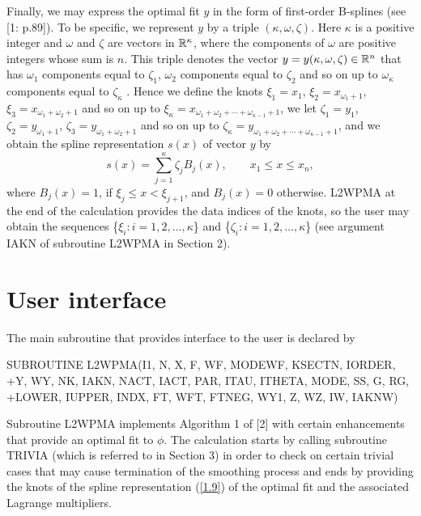 \documentclass[acmtoms]{acmtrans2m}
\begin{document}
Finally, we may express the optimal fit $y$ in the form of first-order
B-splines (see [1: p.89]). To be specific, we represent $y$ by a triple $%
(\kappa ,\omega ,\zeta )$. Here $\kappa $ is a positive integer and $\omega $
and $\zeta $ are vectors in $\Bbb{R}^{\kappa }$, where the components of $%
\omega $ are positive integers whose sum is $n$. This triple denotes the
vector $y=y(\kappa ,\omega ,\zeta )\in \Bbb{R}^{n}$ that has $\omega _{1}$
components equal to $\zeta _{1}$, $\omega _{2}$ components equal to $\zeta
_{2}$ and so on up to $\omega _{\kappa }$ components equal to $\zeta
_{\kappa }$ . Hence we define the knots $\xi _{1}=x_{1}$, $\xi
_{2}=x_{\omega _{1}+1}$, $\xi _{3}=x_{\omega _{1}+\omega _{2}+1}$ and so on
up to $\xi _{\kappa }=x_{\omega _{1}+\omega _{2}+\cdots +\omega _{\kappa
-1}+1}$, we let $\zeta _{1}=y_{1}$, $\zeta _{2}=y_{\omega _{1}+1}$, $\zeta
_{3}=y_{\omega _{1}+\omega _{2}+1}$ and so on up to $\zeta _{\kappa
}=y_{\omega _{1}+\omega _{2}+\cdots +\omega _{\kappa -1}+1}$, and we obtain
the spline representation $s(x)$ of vector $y$ by 
\begin{equation}
s(x)=\sum\limits_{j=1}^{\kappa }\zeta _{j}B_{j}(x),\qquad x_{1}\leq x\leq
x_{n},  \label{1.9}
\end{equation}
where $B_{j}(x)=1$, if $\xi _{j}\leq x<\xi _{j+1}$, and $B_{j}(x)=0$
otherwise. L2WPMA at the end of the calculation provides the data indices of
the knots, so the user may obtain the sequences \{$\xi _{i}:i=1,2,\ldots
,\kappa $\} and \{$\zeta _{i}:i=1,2,\ldots ,\kappa $\} (see argument IAKN of
subroutine L2WPMA in Section 2).

\section{User interface}

The main subroutine that provides interface to the user is declared by

\bigskip 

SUBROUTINE L2WPMA(I1, N, X, F, WF, MODEWF, KSECTN, IORDER, +Y, WY, NK, IAKN,
NACT, IACT, PAR, ITAU, ITHETA, MODE, SS, G, RG, +LOWER, IUPPER, INDX, FT,
WFT, FTNEG, WY1, Z, WZ, IW, IAKNW)

\bigskip 

Subroutine L2WPMA implements Algorithm 1 of [2] with certain enhancements
that provide an optimal fit to $\phi $. The calculation starts by calling
subroutine TRIVIA (which is referred to in Section 3) in order to check on
certain trivial cases that may cause termination of the smoothing process
and ends by providing the knots of the spline representation (\ref{1.9}) of
the optimal fit and the associated Lagrange multipliers.
\end{document}
